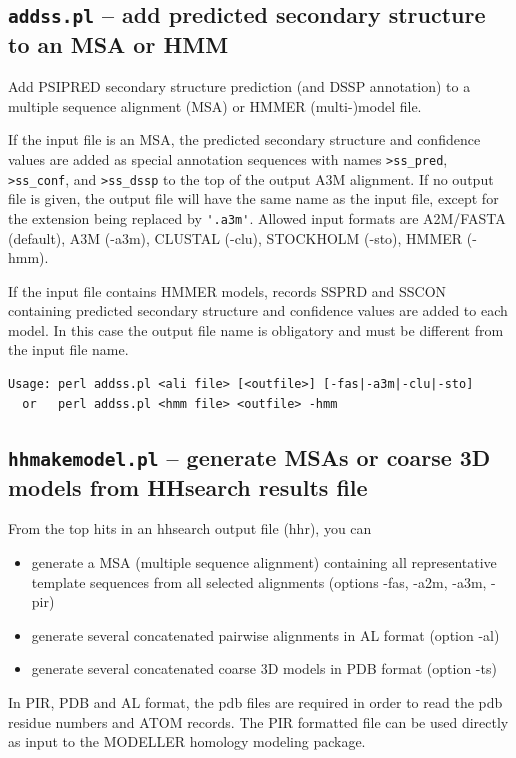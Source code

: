 \documentclass[11pt,a4paper]{article}
\begin{document}
\subsection{{\tt addss.pl} -- add predicted secondary structure to an MSA or HMM}
Add PSIPRED secondary structure prediction (and DSSP annotation) to a multiple sequence alignment (MSA) 
or HMMER (multi-)model file. 

If the input file is an MSA, the predicted secondary structure and confidence values are added as 
special annotation sequences with names \verb`>ss_pred`, \verb`>ss_conf`, and \verb`>ss_dssp` to the top of the output 
A3M alignment. If no output file is given, the output file will have the same name as the input file, 
except for the extension being replaced by \verb`'.a3m'`. Allowed input formats are A2M/FASTA (default), 
A3M (-a3m), CLUSTAL (-clu), STOCKHOLM (-sto), HMMER (-hmm).

If the input file contains HMMER models, records SSPRD and SSCON containing predicted secondary 
structure and confidence values are added to each model. In this case the output file name is 
obligatory and must be different from the input file name.

\small 
\begin{verbatim}
Usage: perl addss.pl <ali file> [<outfile>] [-fas|-a3m|-clu|-sto]  
  or   perl addss.pl <hmm file> <outfile> -hmm  
\end{verbatim} 
\normalsize


\subsection{{\tt hhmakemodel.pl} -- generate MSAs or coarse 3D models from HHsearch results file}

From the top hits in an hhsearch output file (hhr), you can  
\begin{itemize}
\item{generate a MSA (multiple sequence alignment) containing all representative 
template sequences from all selected alignments (options -fas, -a2m, -a3m, -pir)}
\item{generate several concatenated pairwise alignments in AL format (option -al)}
\item{generate several concatenated coarse 3D models in PDB format (option -ts)}
\end{itemize}
In PIR, PDB and AL format, the pdb files are required in order to read the pdb residue numbers 
and ATOM records. The PIR formatted file can be used directly as input to the MODELLER 
homology modeling package.
\end{document}
